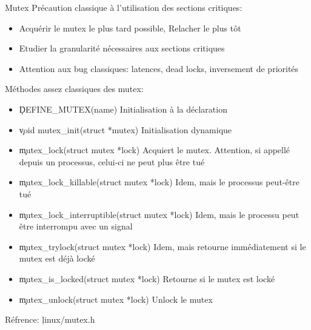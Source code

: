 \begin{frame}{Mutex}
  Précaution classique à l'utilisation des sections critiques:
  \begin{itemize}
  \item Acquérir le mutex le plus tard possible, Relacher le plus tôt
  \item Etudier la granularité nécessaires aux sections critiques
  \item Attention aux bug classiques: latences, dead locks,
    inversement de priorités
  \end{itemize} 
  Méthodes assez classiques des mutex:
  \begin{itemize}
  \item \c{DEFINE_MUTEX(name)} Initialisation à la déclaration
  \item \c{void mutex_init(struct *mutex)} Initialisation dynamique
  \item \c{mutex_lock(struct mutex *lock)} Acquiert le
    mutex. Attention, si appellé depuis un processus, celui-ci ne peut
    plus être tué
  \item \c{mutex_lock_killable(struct mutex *lock)} Idem, mais le
    processus peut-être tué
  \item \c{mutex_lock_interruptible(struct mutex *lock)} Idem, mais le
    processu peut être interrompu avec un signal
  \item \c{mutex_trylock(struct mutex *lock)} Idem, mais retourne
    immédiatement si le mutex est déjà locké
  \item \c{mutex_is_locked(struct mutex *lock)} Retourne si le mutex
    est locké
  \item \c{mutex_unlock(struct mutex *lock)} Unlock le mutex
  \end{itemize}
Réfrence: \c{linux/mutex.h}
\end{frame} 



